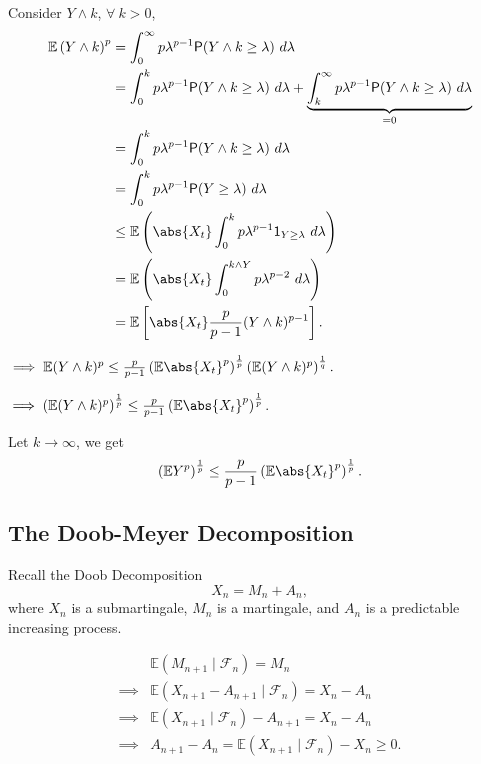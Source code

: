 {    Consider $Y \wedge k$, $\forall~ k > 0$, 
    $$
    \begin{aligned}
        \mathbb{E}\left( Y \wedge k \right)^p &= \int_{0}^{\infty} p \lambda^{p-1}\mathsf{P}(Y\wedge k \geq \lambda)~d \lambda \\
        &= \int_{0}^{k}p \lambda^{p-1}\mathsf{P}(Y \wedge k \geq \lambda)~d \lambda + \underbrace{\int_{k}^{\infty} p \lambda^{p-1}\mathsf{P}(Y\wedge k \geq \lambda)~d \lambda}_{=0} \\
        &= \int_{0}^{k}p \lambda^{p-1}\mathsf{P}(Y \wedge k \geq \lambda)~d\lambda\\
        &= \int_{0}^{k}p \lambda^{p-1}\mathsf{P}(Y \geq \lambda) ~d \lambda\\
        &\leq \mathbb{E}\left( \abs{X_t}
        \int_{0}^{k} p \lambda^{p-1} \mathsf{1}_{Y \geq \lambda}~d \lambda \right)\\
        &= \mathbb{E}\left( \abs{X_t}\int_{0}^{k \wedge Y} p \lambda^{p-2}~d \lambda \right)\\
        &= \mathbb{E}\left[ 
            \abs{X_t} \frac{p}{p-1}(Y \wedge k )^{p-1}
         \right].
    \end{aligned}
    $$

    $\implies \mathbb{E}(Y \wedge k)^p \leq \frac{p}{p-1}\left( \mathbb{E}\abs{X_t}^p \right)^{\frac{1}{p}}\left( 
        \mathbb{E}(Y \wedge k)^p
     \right)^{\frac{1}{q}}.$

    $\implies \left( \mathbb{E}(Y \wedge k)^p \right)^{\frac{1}{p}} \leq \frac{p}{p-1}\left( \mathbb{E}\abs{X_t}^p \right)^{\frac{1}{p}}$.

    Let $k\to \infty$, we get
    $$
        \left( \mathbb{E} Y^p \right)^{\frac{1}{p}} \leq \frac{p}{p-1}\left( \mathbb{E}\abs{X_t}^p \right)^{\frac{1}{p}}.
    $$
}

\subsection{The Doob-Meyer Decomposition}
Recall the Doob Decomposition
$$
    X_n = M_n + A_n,
$$
where $X_n$ is a submartingale, $M_n$ is a martingale, and $A_n$ is a predictable increasing process.

$$
    \begin{aligned}
        &\mathbb{E}\left( M_{n+1} \mid \mathcal{F}_n \right) = M_n \\
        \implies& \mathbb{E}(X_{n+1}- A_{n+1}\mid \mathcal{F}_n) = X_n - A_n \\
        \implies& \mathbb{E}(X_{n+1}\mid \mathcal{F}_n) - A_{n+1} = X_n - A_n \\
        \implies& A_{n+1} - A_n = \mathbb{E}(X_{n+1}\mid \mathcal{F}_n) - X_ n \geq 0.
    \end{aligned}
$$

